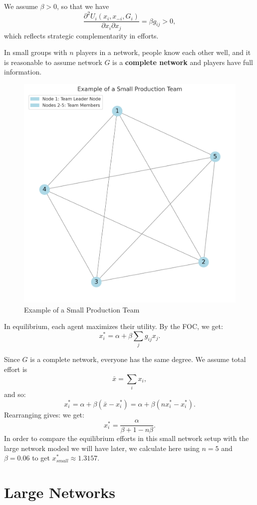 \documentclass[12pt]{article}
\begin{document}
We assume $\beta > 0$, so that we have
\[
\frac{\partial^2 U_i(x_i, x_{-i}, G_i)}{\partial x_i \partial x_j} = \beta g_{ij} > 0,
\]
which reflects strategic complementarity in efforts.

In small groups with $n$ players in a network, people know each other well, and it is reasonable to assume network $G$ is a \textbf{complete network} and players have full information.

\begin{figure}[H]
  \centering
  \includegraphics[height=0.6\textwidth]{small network1.png}
  \caption{Example of a Small Production Team}
  \label{fig:small-team}
\end{figure}

In equilibrium, each agent maximizes their utility. By the FOC, we get:
\[
x_i^* = \alpha + \beta \sum_j g_{ij} x_j. \tag{2}
\]

Since $G$ is a complete network, everyone has the same degree. We assume total effort is  
\[
\bar{x} = \sum_i x_i,
\]
and so:
\[
x_i^* = \alpha + \beta (\bar{x}-x_i^*) = \alpha + \beta(n x_i^*-x_i^*).
\]
Rearranging gives:
 we get:
\[
x_i^* = \frac{\alpha}{\beta+1-n \beta}.
\]
In order to compare the equilibrium efforts in this small network setup with the large network modesl we will have later, we calculate here using $n=5$ and $\beta=0.06$ to get $x^*_{small} \approx 1.3157$.
\section{Large Networks}
\end{document}
